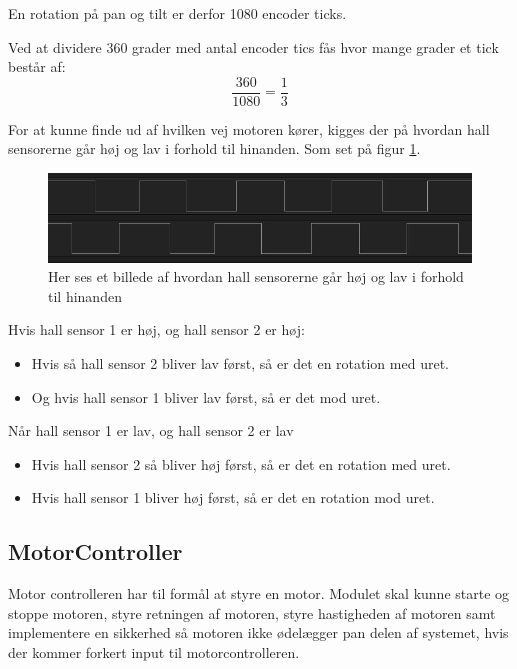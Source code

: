 En rotation på pan og tilt er derfor 1080 encoder ticks.

Ved at dividere 360 grader med antal encoder tics fås hvor mange grader et tick består af:
\begin{equation}
\frac{360}{1080} = \frac{1}{3}
\end{equation}

For at kunne finde ud af hvilken vej motoren kører, kigges der på hvordan hall sensorerne går høj og lav i forhold til hinanden. Som set på figur \ref{fig:Hall_Sensorer}.

\begin{figure}[ht]
	\begin{center}
		\includegraphics[scale=0.5]{Billeder/Hall_sensorer.png}
	\end{center}
\label{fig:Hall_Sensorer}
\caption{Her ses et billede af hvordan hall sensorerne går høj og lav i forhold til hinanden}
\end{figure}

Hvis hall sensor 1 er høj, og hall sensor 2 er høj:\\
	\begin{itemize}
	\item Hvis så hall sensor 2 bliver lav først, så er det en rotation med uret.\\
	\item Og hvis hall sensor 1 bliver lav først, så er det mod uret.\\
	\end{itemize}

Når hall sensor 1 er lav, og hall sensor 2 er lav\\
	\begin{itemize}
\item Hvis hall sensor 2 så bliver høj først, så er det en rotation med uret.\\
	\item Hvis hall sensor 1 bliver høj først, så er det en rotation mod uret.\\
	\end{itemize}
	
\subsection{MotorController}
Motor controlleren har til formål at styre en motor. Modulet skal kunne starte og stoppe motoren, styre retningen af motoren, styre hastigheden af motoren samt implementere en sikkerhed så motoren ikke ødelægger pan delen af systemet, hvis der kommer forkert input til motorcontrolleren.

